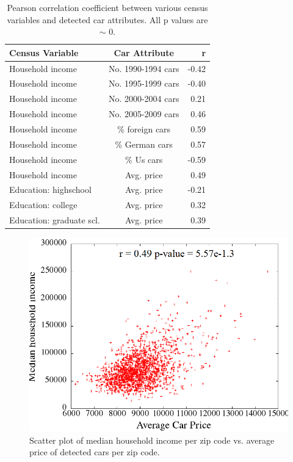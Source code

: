 \documentclass[10pt,twocolumn,letterpaper]{article}
\begin{document}
\begin{table}
\begin{center}
\begin{tabular}{|l|c|r|}
\hline
\textbf{Census Variable} & \textbf{Car Attribute} & \textbf{r}  \\
\hline\hline
Household income & No. 1990-1994 cars & -0.42 \\
Household income & No. 1995-1999 cars & -0.40 \\
Household income & No. 2000-2004 cars & 0.21 \\
Household income & No. 2005-2009 cars & 0.46 \\
Household income & \% foreign cars & 0.59 \\
Household income & \% German cars & 0.57 \\
Household income & \% Us cars & -0.59 \\
Household income & Avg. price & 0.49 \\
Education: highschool & Avg. price & -0.21 \\
Education: college & Avg. price & 0.32 \\
Education: graduate scl. & Avg. price & 0.39 \\
\hline
\end{tabular}
\end{center}
\caption{Pearson correlation coefficient between various census variables and detected car attributes. All p values are \(\sim\) 0.}
\label{table:car-census-corrs}
\end{table}

\begin{figure}[t]
\begin{center}
   \includegraphics[width=0.9\linewidth]{img/averagePriceIncome.png}
\end{center}
   \caption {Scatter plot of median household income per zip code vs. average price of detected cars per zip code.}
\label{fig:price-income-corr}
\end{figure}
\end{document}
